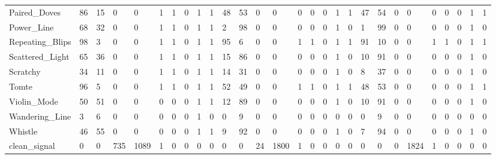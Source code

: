 \begin{tabular}{lllllrrlrrllllrrlllllllrrlll}
Paired_Doves & 86 & 15 & 0 & 0 & 1 & 1 & 0 & 1 & 1 & 48 & 53 & 0 & 0 & 0 & 0 & 0 & 1 & 1 & 47 & 54 & 0 & 0 & 0 & 0 & 0 & 1 & 1 \\
Power_Line & 68 & 32 & 0 & 0 & 1 & 1 & 0 & 1 & 1 & 2 & 98 & 0 & 0 & 0 & 0 & 0 & 1 & 0 & 1 & 99 & 0 & 0 & 0 & 0 & 0 & 1 & 0 \\
Repeating_Blips & 98 & 3 & 0 & 0 & 1 & 1 & 0 & 1 & 1 & 95 & 6 & 0 & 0 & 1 & 1 & 0 & 1 & 1 & 91 & 10 & 0 & 0 & 1 & 1 & 0 & 1 & 1 \\
Scattered_Light & 65 & 36 & 0 & 0 & 1 & 1 & 0 & 1 & 1 & 15 & 86 & 0 & 0 & 0 & 0 & 0 & 1 & 0 & 10 & 91 & 0 & 0 & 0 & 0 & 0 & 1 & 0 \\
Scratchy & 34 & 11 & 0 & 0 & 1 & 1 & 0 & 1 & 1 & 14 & 31 & 0 & 0 & 0 & 0 & 0 & 1 & 0 & 8 & 37 & 0 & 0 & 0 & 0 & 0 & 1 & 0 \\
Tomte & 96 & 5 & 0 & 0 & 1 & 1 & 0 & 1 & 1 & 52 & 49 & 0 & 0 & 1 & 1 & 0 & 1 & 1 & 48 & 53 & 0 & 0 & 0 & 0 & 0 & 1 & 1 \\
Violin_Mode & 50 & 51 & 0 & 0 & 0 & 0 & 0 & 1 & 1 & 12 & 89 & 0 & 0 & 0 & 0 & 0 & 1 & 0 & 10 & 91 & 0 & 0 & 0 & 0 & 0 & 1 & 0 \\
Wandering_Line & 3 & 6 & 0 & 0 & 0 & 0 & 0 & 1 & 0 & 0 & 9 & 0 & 0 & 0 & 0 & 0 & 0 & 0 & 0 & 9 & 0 & 0 & 0 & 0 & 0 & 0 & 0 \\
Whistle & 46 & 55 & 0 & 0 & 0 & 0 & 0 & 1 & 1 & 9 & 92 & 0 & 0 & 0 & 0 & 0 & 1 & 0 & 7 & 94 & 0 & 0 & 0 & 0 & 0 & 1 & 0 \\
clean_signal & 0 & 0 & 735 & 1089 & 1 & 0 & 0 & 0 & 0 & 0 & 0 & 24 & 1800 & 1 & 0 & 0 & 0 & 0 & 0 & 0 & 0 & 1824 & 1 & 0 & 0 & 0 & 0 \\
\bottomrule
\end{tabular}

